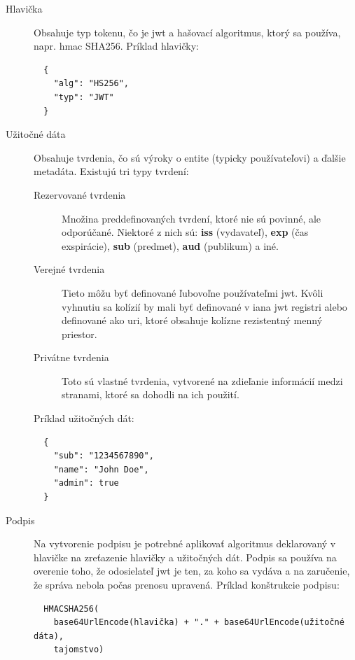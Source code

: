 \begin{description}
\item[Hlavička] Obsahuje typ tokenu, čo je \acrshort{jwt} a hašovací algoritmus,
  ktorý sa používa, napr. \acrshort{hmac} SHA256. Príklad hlavičky:

  \begin{verbatim}
  {
    "alg": "HS256",
    "typ": "JWT"
  }
  \end{verbatim}

\item[Užitočné dáta] Obsahuje tvrdenia, čo sú výroky o entite (typicky
  používateľovi) a ďalšie metadáta. Existujú tri typy tvrdení:

  \begin{description}
  \item[Rezervované tvrdenia] Množina preddefinovaných tvrdení, ktoré nie sú
    povinné, ale odporúčané. Niektoré z nich sú: \textbf{iss} (vydavateľ),
    \textbf{exp} (čas exspirácie), \textbf{sub} (predmet), \textbf{aud}
    (publikum) a iné.
  \item[Verejné tvrdenia] Tieto môžu byť definované ľubovoľne používateľmi
    \acrshort{jwt}. Kvôli vyhnutiu sa kolízií by mali byť definované v
    \acrshort{iana} \acrlong{jwt} registri alebo definované ako \acrshort{uri},
    ktoré obsahuje kolízne rezistentný menný priestor.
  \item[Privátne tvrdenia] Toto sú vlastné tvrdenia, vytvorené na zdieľanie
    informácií medzi stranami, ktoré sa dohodli na ich použití.
  \end{description}

  Príklad užitočných dát:

  \begin{verbatim}
  {
    "sub": "1234567890",
    "name": "John Doe",
    "admin": true
  }
  \end{verbatim}

\item[Podpis] Na vytvorenie podpisu je potrebné aplikovať algoritmus deklarovaný
  v hlavičke na zreťazenie hlavičky a užitočných dát. Podpis sa používa na
  overenie toho, že odosielateľ \acrshort{jwt} je ten, za koho sa vydáva a na
  zaručenie, že správa nebola počas prenosu upravená. \cite{rfc7519, jwt_io}
  Príklad konštrukcie podpisu:

  \begin{verbatim}
  HMACSHA256(
    base64UrlEncode(hlavička) + "." + base64UrlEncode(užitočné dáta),
    tajomstvo)
  \end{verbatim}
\end{description}

